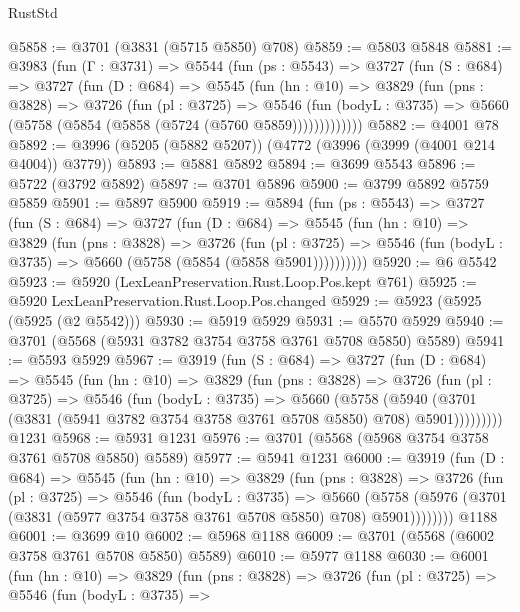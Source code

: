 \begin{lexlean}{RustStd}
\begin{coremodule}
@5858 := @3701 (@3831 (@5715 @5850) @708)
@5859 := @5803 @5848
@5881 := @3983
    (fun (Γ : @3731) =>
    @5544
      (fun (ps : @5543) =>
      @3727
        (fun (S : @684) =>
        @3727
          (fun (D : @684) =>
          @5545
            (fun (hn : @10) =>
            @3829
              (fun (pns : @3828) =>
              @3726
                (fun (pl : @3725) =>
                @5546
                  (fun (bodyL : @3735) =>
                  @5660 (@5758 (@5854 (@5858 (@5724 (@5760 @5859)))))))))))))
@5882 := @4001 @78
@5892 := @3996 (@5205 (@5882 @5207)) (@4772 (@3996 (@3999 (@4001 @214 @4004)) @3779))
@5893 := @5881 @5892
@5894 := @3699 @5543
@5896 := @5722 (@3792 @5892)
@5897 := @3701 @5896
@5900 := @3799 @5892 @5759 @5859
@5901 := @5897 @5900
@5919 := @5894
    (fun (ps : @5543) =>
    @3727
      (fun (S : @684) =>
      @3727
        (fun (D : @684) =>
        @5545
          (fun (hn : @10) =>
          @3829
            (fun (pns : @3828) =>
            @3726
              (fun (pl : @3725) =>
              @5546 (fun (bodyL : @3735) => @5660 (@5758 (@5854 (@5858 @5901))))))))))
@5920 := @6 @5542
@5923 := @5920 (LexLeanPreservation.Rust.Loop.Pos.kept @761)
@5925 := @5920 LexLeanPreservation.Rust.Loop.Pos.changed
@5929 := @5923 (@5925 (@5925 (@2 @5542)))
@5930 := @5919 @5929
@5931 := @5570 @5929
@5940 := @3701 (@5568 (@5931 @3782 @3754 @3758 @3761 @5708 @5850) @5589)
@5941 := @5593 @5929
@5967 := @3919
    (fun (S : @684) =>
    @3727
      (fun (D : @684) =>
      @5545
        (fun (hn : @10) =>
        @3829
          (fun (pns : @3828) =>
          @3726
            (fun (pl : @3725) =>
            @5546
              (fun (bodyL : @3735) =>
              @5660
                (@5758
                  (@5940
                    (@3701 (@3831 (@5941 @3782 @3754 @3758 @3761 @5708 @5850) @708) @5901)))))))))
    @1231
@5968 := @5931 @1231
@5976 := @3701 (@5568 (@5968 @3754 @3758 @3761 @5708 @5850) @5589)
@5977 := @5941 @1231
@6000 := @3919
    (fun (D : @684) =>
    @5545
      (fun (hn : @10) =>
      @3829
        (fun (pns : @3828) =>
        @3726
          (fun (pl : @3725) =>
          @5546
            (fun (bodyL : @3735) =>
            @5660
              (@5758 (@5976 (@3701 (@3831 (@5977 @3754 @3758 @3761 @5708 @5850) @708) @5901))))))))
    @1188
@6001 := @3699 @10
@6002 := @5968 @1188
@6009 := @3701 (@5568 (@6002 @3758 @3761 @5708 @5850) @5589)
@6010 := @5977 @1188
@6030 := @6001
    (fun (hn : @10) =>
    @3829
      (fun (pns : @3828) =>
      @3726
        (fun (pl : @3725) =>
        @5546
          (fun (bodyL : @3735) =>

\end{coremodule}
\end{lexlean}
